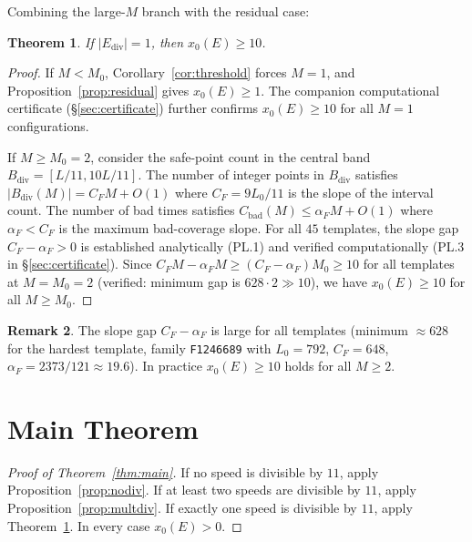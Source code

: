 \documentclass[11pt]{article}
\newtheorem{theorem}{Theorem}[section]
\theoremstyle{definition}
\newtheorem{remark}[theorem]{Remark}
\newcommand{\Ediv}{E_{\mathrm{div}}}
\newcommand{\Bdiv}{B_{\mathrm{div}}}
\begin{document}
Combining the large-$M$ branch with the residual case:

\begin{theorem}
  \label{thm:onediv}
  If $|\Ediv| = 1$, then $x_0(E) \geq 10$.
\end{theorem}

\begin{proof}
  If $M < M_0$, Corollary~\ref{cor:threshold} forces $M = 1$, and
  Proposition~\ref{prop:residual} gives $x_0(E) \geq 1$.
  The companion computational certificate (\S\ref{sec:certificate})
  further confirms $x_0(E) \geq 10$ for all $M = 1$ configurations.

  If $M \geq M_0 = 2$, consider the safe-point count in the central band
  $\Bdiv = [L/11, 10L/11]$.
  The number of integer points in $\Bdiv$ satisfies
  $|\Bdiv(M)| = C_F M + O(1)$
  where $C_F = 9L_0/11$ is the slope of the interval count.
  The number of bad times satisfies $C_{\mathrm{bad}}(M) \leq \alpha_F M + O(1)$
  where $\alpha_F < C_F$ is the maximum bad-coverage slope.
  For all $45$ templates, the slope gap $C_F - \alpha_F > 0$ is established
  analytically (PL.1) and verified computationally (PL.3 in
  \S\ref{sec:certificate}).
  Since $C_F M - \alpha_F M \geq (C_F - \alpha_F) M_0 \geq 10$ for all
  templates at $M = M_0 = 2$ (verified: minimum gap is $628 \cdot 2 \gg 10$),
  we have $x_0(E) \geq 10$ for all $M \geq M_0$.
\end{proof}

\begin{remark}
  The slope gap $C_F - \alpha_F$ is large for all templates
  (minimum $\approx 628$ for the hardest template, family \texttt{F1246689}
  with $L_0 = 792$, $C_F = 648$, $\alpha_F = 2373/121 \approx 19.6$).
  In practice $x_0(E) \geq 10$ holds for all $M \geq 2$.
\end{remark}

\section{Main Theorem}

\begin{proof}[Proof of Theorem~\ref{thm:main}]
  If no speed is divisible by $11$, apply
  Proposition~\ref{prop:nodiv}.
  If at least two speeds are divisible by $11$, apply
  Proposition~\ref{prop:multdiv}.
  If exactly one speed is divisible by $11$, apply
  Theorem~\ref{thm:onediv}.
  In every case $x_0(E) > 0$.
\end{proof}
\end{document}
